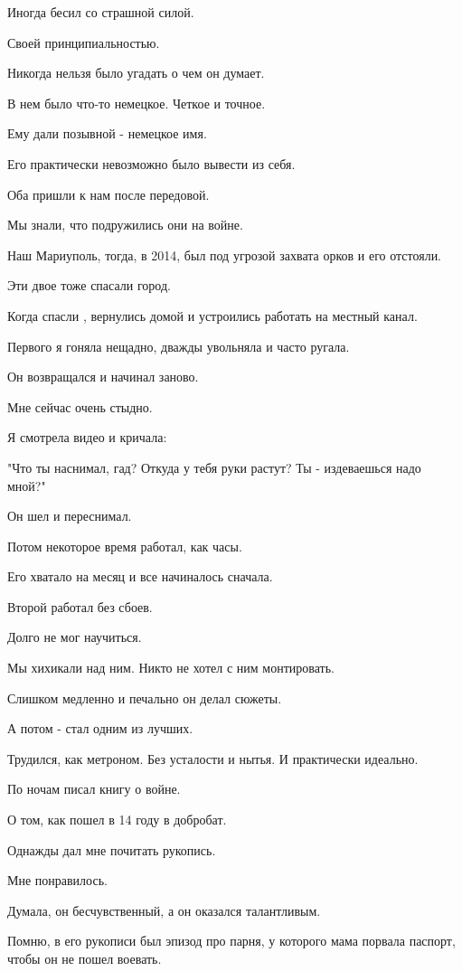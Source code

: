 Иногда бесил со страшной силой. 

Своей принципиальностью. 

Никогда нельзя было угадать  о чем он думает. 

В нем было что-то немецкое.  Четкое и точное. 

Ему  дали позывной - немецкое имя. 

Его практически невозможно было вывести из себя. 

Оба пришли к нам после передовой. 

Мы  знали, что подружились они  на войне. 

Наш Мариуполь,  тогда, в 2014,   был под угрозой захвата орков  и его отстояли. 

Эти двое  тоже спасали город.

Когда спасли , вернулись домой   и устроились работать на местный  канал.  

Первого я гоняла нещадно, дважды увольняла и  часто ругала. 

Он возвращался и начинал заново. 


Мне сейчас очень стыдно. 

Я смотрела видео и кричала:

 "Что ты наснимал,  гад? Откуда у тебя руки растут? Ты -  издеваешься надо
 мной?"

Он шел и переснимал. 

Потом некоторое время работал, как часы. 

Его хватало на месяц и  все начиналось сначала. 

Второй работал без сбоев. 

Долго не мог научиться. 

Мы хихикали над ним. Никто не хотел с ним монтировать. 

Слишком медленно и печально он делал сюжеты.  

А  потом  -   стал одним из лучших. 

Трудился, как метроном. Без усталости и нытья. И практически идеально. 

По ночам  писал книгу о войне. 

О том, как пошел в 14 году в добробат. 

Однажды дал мне почитать рукопись. 

Мне понравилось. 

Думала, он бесчувственный, а он оказался талантливым. 

Помню,  в его рукописи был эпизод про парня, у которого мама порвала  паспорт,
чтобы он не пошел воевать. 

